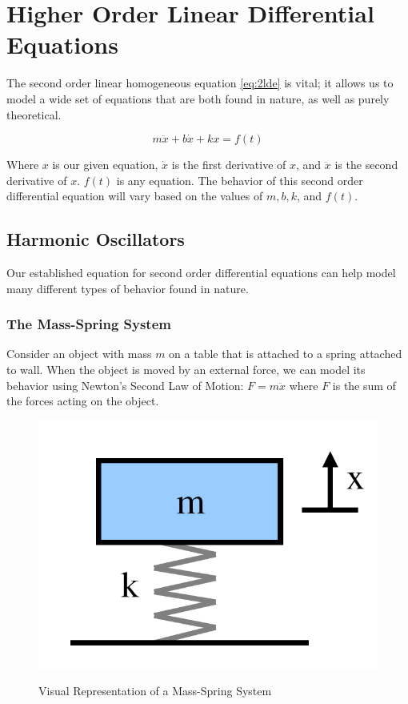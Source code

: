 \section{Higher Order Linear Differential Equations}
The second order linear homogeneous equation \eqref{eq:2lde} is vital; it allows us to model a wide set of equations that are both found in nature, as well as purely theoretical.

    \begin{equation}\label{eq:2lde}
        m \ddot{x} + b \dot{x} + kx = f(t)
    \end{equation}

    Where $x$ is our given equation, $\dot{x}$ is the first derivative of $x$, and $\ddot{x}$ is the second derivative of $x$. $f(t)$ is any equation. The behavior of this second order differential equation will vary based on the values of $m, b, k$, and $f(t)$.

    \subsection{Harmonic Oscillators}
    Our established equation for second order differential equations can help model many different types of behavior found in nature.

        \subsubsection{The Mass-Spring System}
        Consider an object with mass $m$ on a table that is attached to a spring attached to wall. When the object is moved by an external force, we can model its behavior using Newton's Second Law of Motion: $F = m \ddot{x}$ where $F$ is the sum of the forces acting on the object.

        \begin{figure}[h!]
            \centering
            \includegraphics[scale=0.25]{./img/mass_spring.png}
            \label{fig:massspringsystem}
            \caption{Visual Representation of a Mass-Spring System}
        \end{figure}

